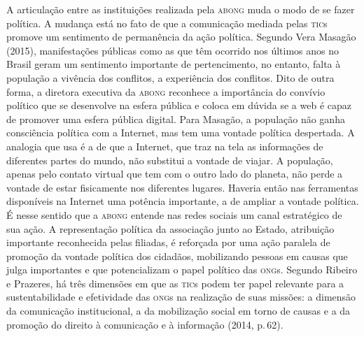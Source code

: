 A articulação entre as instituições realizada pela \textsc{abong} muda o modo de
se fazer política. A mudança está no fato de que a comunicação mediada
pelas \textsc{tic}s promove um sentimento de permanência da ação política.
Segundo Vera Masagão (2015), manifestações públicas como as que têm
ocorrido nos últimos anos no Brasil geram um sentimento importante de
pertencimento, no entanto, falta à população a vivência dos conflitos, a
experiência dos conflitos. Dito de outra forma, a diretora executiva da
\textsc{abong} reconhece a importância do convívio político que se desenvolve na
esfera pública e coloca em dúvida se a web é capaz de promover uma
esfera pública digital. Para Masagão, a população não ganha consciência
política com a Internet, mas tem uma vontade política despertada. A
analogia que usa é a de que a Internet, que traz na tela as informações
de diferentes partes do mundo, não substitui a vontade de viajar. A
população, apenas pelo contato virtual que tem com o outro lado do
planeta, não perde a vontade de estar fisicamente nos diferentes
lugares. Haveria então nas ferramentas disponíveis na Internet uma
potência importante, a de ampliar a vontade política. É nesse sentido
que a \textsc{abong} entende nas redes sociais um canal estratégico de sua ação.
A representação política da associação junto ao Estado, atribuição
importante reconhecida pelas filiadas, é reforçada por uma ação paralela
de promoção da vontade política dos cidadãos, mobilizando pessoas em
causas que julga importantes e que potencializam o papel político das
\textsc{ong}s. Segundo Ribeiro e Prazeres, há três dimensões em que as \textsc{tic}s podem
ter papel relevante para a sustentabilidade e efetividade das \textsc{ong}s na
realização de suas missões: a dimensão da comunicação institucional, a
da mobilização social em torno de causas e a da promoção do direito à
comunicação e à informação (2014, p.\,62).

